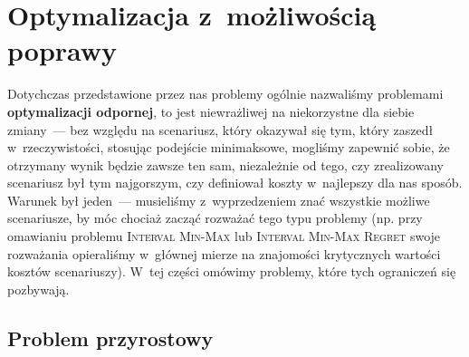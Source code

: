 \section{Optymalizacja z~możliwością poprawy}




Dotychczas przedstawione przez nas problemy ogólnie nazwaliśmy problemami \textbf{optymalizacji odpornej}, to jest niewrażliwej na niekorzystne dla siebie zmiany~--- bez względu na scenariusz, który okazywał się tym, który zaszedł w~rzeczywistości, stosując podejście minimaksowe, mogliśmy zapewnić sobie, że otrzymany wynik będzie zawsze ten sam, niezależnie od tego, czy zrealizowany scenariusz był tym najgorszym, czy definiował koszty w~najlepszy dla nas sposób.
Warunek był jeden~--- musieliśmy z~wyprzedzeniem znać wszystkie możliwe scenariusze, by móc chociaż zacząć rozważać tego typu problemy (np. przy omawianiu problemu \textsc{Interval Min-Max} lub \textsc{Interval Min-Max Regret} swoje rozważania opieraliśmy w~głównej mierze na znajomości krytycznych wartości kosztów scenariuszy).
W~tej części omówimy problemy, które tych ograniczeń się pozbywają.



\subsection{Problem przyrostowy}



